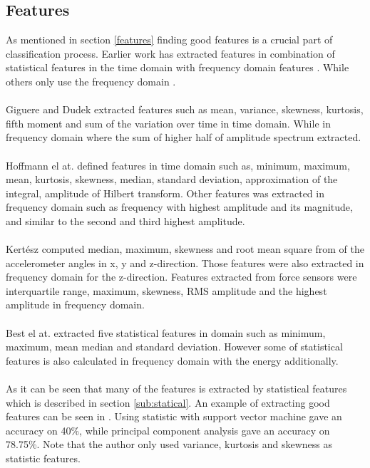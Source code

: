 \documentclass[USenglish]{ifimaster}  %
\begin{document}
\subsection{Features} \label{sub:relatedfeatures}
As mentioned in section \ref{features} finding good features is a crucial part of classification process. Earlier work has extracted features in combination of statistical features in the time domain with frequency domain features \cite{5152662} \cite{Giguere2009} \cite{5509309}. While others only use the frequency domain \cite{4543710} \cite{5979766}.
\\
\\
Giguere and Dudek \cite{5152662} extracted features such as mean, variance, skewness, kurtosis, fifth moment and sum of the variation over time in time domain. While in frequency domain where the sum of higher half of amplitude spectrum extracted.
\\
\\
Hoffmann el at. \cite{Hoffmann20141790} defined features in time domain such as, minimum, maximum, mean, kurtosis, skewness, median, standard deviation, approximation of the integral, amplitude of Hilbert transform. Other features was extracted in frequency domain such as frequency with highest amplitude and its magnitude, and similar to the second and third highest amplitude. 
\\
\\
Kertész \cite{7387710} computed median, maximum, skewness and root mean square from of the accelerometer angles in x, y and z-direction. Those features were also extracted in frequency domain for the z-direction. Features extracted from force sensors were interquartile range, maximum, skewness, RMS amplitude and the highest amplitude in frequency domain.
\\
\\
Best el at.\cite{26b23e912c654fe4b7478fd910130195} extracted five statistical features in domain such as minimum, maximum, mean median and standard deviation. However some of statistical features is also calculated in frequency domain with the energy additionally.
\\
\\
As it can be seen that many of the features is extracted by statistical features which is described in section \ref{sub:statical}. An example of extracting good features can be seen in \cite{5602459}. Using statistic with support vector machine gave an accuracy on 40\%, while principal component analysis gave an accuracy on 78.75\%. Note that the author only used variance, kurtosis and skewness as statistic features. 
	
\end{document}
